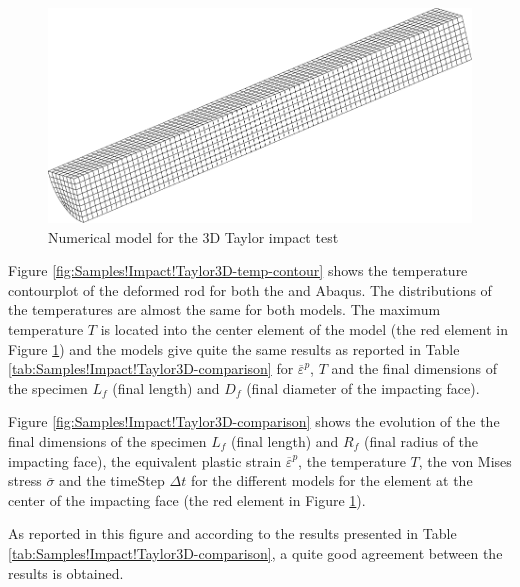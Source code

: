 \begin{figure}[h]
\begin{centering}
\includegraphics[width=0.5\columnwidth]{Figures/Samples/Impact/Taylor-3D_mesh}
\par\end{centering}
\caption{Numerical model for the 3D Taylor impact test\label{fig:Samples!Impact!Taylor3D}}
\end{figure}

Figure \ref{fig:Samples!Impact!Taylor3D-temp-contour} shows the temperature
contourplot of the deformed rod for both the \DynELA and Abaqus.
The distributions of the temperatures are almost the same for both
models. The maximum temperature $T$ is located into the center element
of the model (the red element in Figure \ref{fig:Samples!Impact!Taylor3D})
and the models give quite the same results as reported in Table \ref{tab:Samples!Impact!Taylor3D-comparison}
for $\overline{\varepsilon}^{p}$, $T$ and the final dimensions of
the specimen $L_{f}$ (final length) and $D_{f}$ (final diameter
of the impacting face).

Figure \ref{fig:Samples!Impact!Taylor3D-comparison} shows the evolution
of the the final dimensions of the specimen $L_{f}$ (final length)
and $R_{f}$ (final radius of the impacting face), the equivalent
plastic strain $\overline{\varepsilon}^{p}$, the temperature $T$,
the von Mises stress $\overline{\sigma}$ and the timeStep $\Delta t$
for the different models for the element at the center of the impacting
face (the red element in Figure \ref{fig:Samples!Impact!Taylor3D}).

As reported in this figure and according to the results presented
in Table \ref{tab:Samples!Impact!Taylor3D-comparison}, a quite good
agreement between the results is obtained.

